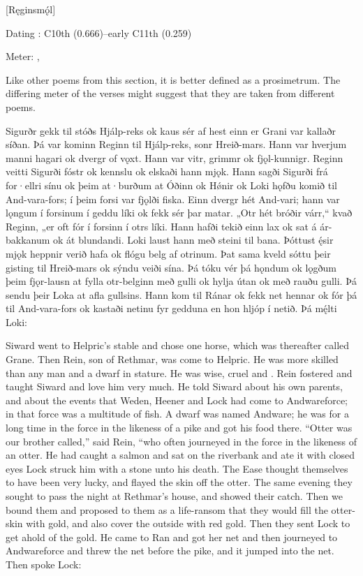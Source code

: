 [Ręginsmǫ́l]

\begin{flushright}%
Dating \parencite{Sapp2022}: C10th (0.666)–early C11th (0.259)

Meter: \Ljodahattr, \Fornyrdislag%
\end{flushright}

Like other poems from this section, it is better defined as a prosimetrum. The differing meter of the verses might suggest that they are taken from different poems.

\sectionline

\bpg\bpa Sigurðr gekk til stóðs Hjálp-reks ok kaus sér af hest einn er Grani var kallaðr síðan. Þá var kominn Reginn til Hjálp-reks, sonr Hreið-mars. Hann var hverjum manni hagari ok dvergr of vǫxt. Hann var vitr, grimmr ok fjǫl-kunnigr. Reginn veitti Sigurði fóstr ok kennslu ok elskaði hann mjǫk. Hann sagði Sigurði frá for·ellri sínu ok þeim at·burðum at Óðinn ok Hǿnir ok Loki hǫfðu komið til And-vara-fors; í þeim forsi var fjǫlði fiska. Einn dvergr hét And-vari; hann var lǫngum í forsinum í geddu líki ok fekk sér þar matar. „Otr hét bróðir várr,“ kvað Reginn, „er oft fór í forsinn í otrs líki. Hann hafði tekið einn lax ok sat á ár-bakkanum ok át blundandi. Loki laust hann með steini til bana. Þóttust ę́sir mjǫk heppnir verið hafa ok flógu belg af otrinum. Þat sama kveld sóttu þeir gisting til Hreið-mars ok sýndu veiði sína. Þá tóku vér þá hǫndum ok lǫgðum þeim fjǫr-lausn at fylla otr-belginn með gulli ok hylja útan ok með rauðu gulli. Þá sendu þeir Loka at afla gullsins. Hann kom til Ránar ok fekk net hennar ok fór þá til And-vara-fors ok kastaði netinu fyr gedduna en hon hljóp í netið. Þá mę́lti Loki:\epa

\bpb Siward went to Helpric’s stable and chose one horse, which was thereafter called Grane. Then Rein, son of Rethmar, was come to Helpric. He was more skilled than any man and a dwarf in stature. He was wise, cruel and . Rein fostered and taught Siward and love him very much. He told Siward about his own parents, and about the events that Weden, Heener and Lock had come to Andwareforce; in that force was a multitude of fish. A dwarf was named Andware; he was for a long time in the force in the likeness of a pike and got his food there. “Otter was our brother called,” said Rein, “who often journeyed in the force in the likeness of an otter. He had caught a salmon and sat on the riverbank and ate it with closed eyes Lock struck him with a stone unto his death. The Ease thought themselves to have been very lucky, and flayed the skin off the otter. The same evening they sought to pass the night at Rethmar’s house, and showed their catch. Then we bound them and proposed to them as a life-ransom that they would fill the otter-skin with gold, and also cover the outside with red gold. Then they sent Lock to get ahold of the gold. He came to Ran and got her net and then journeyed to Andwareforce and threw the net before the pike, and it jumped into the net. Then spoke Lock:\epb\epg


